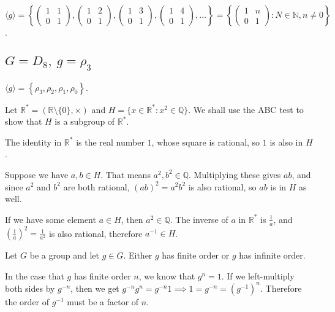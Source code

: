 \documentclass[a4paper]{article}
\begin{document}
$\langle g \rangle = \left\{ \begin{pmatrix}1 & 1\\ 0 & 1\end{pmatrix}, \begin{pmatrix}1 & 2\\ 0 & 1\end{pmatrix}, \begin{pmatrix}1 & 3\\ 0 & 1\end{pmatrix}, \begin{pmatrix}1 & 4\\ 0 & 1\end{pmatrix}, \ldots \right\} = \left\{\begin{pmatrix}1 & n\\ 0 & 1\end{pmatrix} : N \in \mathbb N, n \ne 0\right\}$.

\subsection{$G = D_8,\ g = \rho_3$}

$\langle g \rangle = \left\{ \rho_3, \rho_2, \rho_1, \rho_0 \right\}$.


Let $\mathbb R^* = (\mathbb R \setminus \{0\}, \times)$ and $H = \{x \in \mathbb R^* : x^2 \in \mathbb Q\}$. We shall use the ABC test to show that $H$ is a subgroup of $\mathbb R^*$.

The identity in $\mathbb R^*$ is the real number $1$, whose square is rational, so $1$ is also in $H$.

Suppose we have $a, b \in H$. That means $a^2, b^2 \in \mathbb Q$. Multiplying these gives $ab$, and since $a^2$ and $b^2$ are both rational, $(ab)^2 = a^2 b^2$ is also rational, so $ab$ is in $H$ as well.

If we have some element $a \in H$, then $a^2 \in \mathbb Q$. The inverse of $a$ in $\mathbb R^*$ is $\frac1a$, and $\left(\frac1a\right)^2 = \frac1{a^2}$ is also rational, therefore $a^{-1} \in H$.


Let $G$ be a group and let $g \in G$. Either $g$ has finite order or $g$ has infinite order.

In the case that $g$ has finite order $n$, we know that $g^n = 1$. If we left-multiply both sides by $g^{-n}$, then we get $g^{-n} g^n = g^{-n} 1 \implies 1 = g^{-n} = \left(g^{-1}\right)^n$. Therefore the order of $g^{-1}$ must be a factor of $n$.
\end{document}
